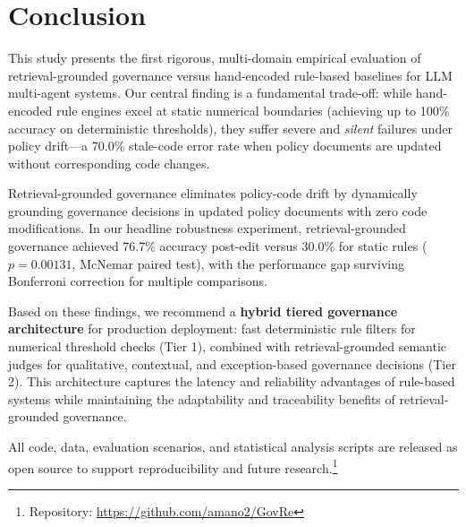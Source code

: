 \documentclass[sigconf,screen]{acmart}
\begin{document}
\section{Conclusion}
This study presents the first rigorous, multi-domain empirical evaluation of retrieval-grounded governance versus hand-encoded rule-based baselines for LLM multi-agent systems. Our central finding is a fundamental trade-off: while hand-encoded rule engines excel at static numerical boundaries (achieving up to 100\% accuracy on deterministic thresholds), they suffer severe and \emph{silent} failures under policy drift---a 70.0\% stale-code error rate when policy documents are updated without corresponding code changes.

Retrieval-grounded governance eliminates policy-code drift by dynamically grounding governance decisions in updated policy documents with zero code modifications. In our headline robustness experiment, retrieval-grounded governance achieved 76.7\% accuracy post-edit versus 30.0\% for static rules ($p = 0.00131$, McNemar paired test), with the performance gap surviving Bonferroni correction for multiple comparisons.

Based on these findings, we recommend a \textbf{hybrid tiered governance architecture} for production deployment: fast deterministic rule filters for numerical threshold checks (Tier 1), combined with retrieval-grounded semantic judges for qualitative, contextual, and exception-based governance decisions (Tier 2). This architecture captures the latency and reliability advantages of rule-based systems while maintaining the adaptability and traceability benefits of retrieval-grounded governance.

All code, data, evaluation scenarios, and statistical analysis scripts are released as open source to support reproducibility and future research.\footnote{Repository: \url{https://github.com/amano2/GovRe}}

\balance



\end{document}
